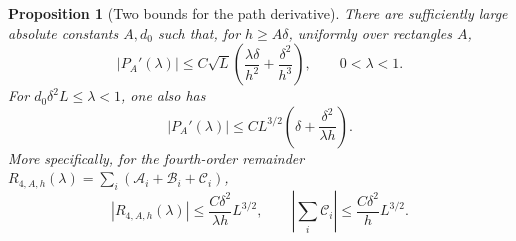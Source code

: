 \documentclass[11pt,letterpaper]{article}
\newtheorem{proposition}{Proposition}
\theoremstyle{remark}
\begin{document}
\begin{proposition}[Two bounds for the path derivative]
\label{appx-an:prop:derivative}
There are sufficiently large absolute constants \(A,d_0\) such that,
for \(h\ge A\delta\), uniformly over rectangles \(A\),
\begin{equation}
 |P_A'(\lambda)|
 \le C\sqrt L\left(\frac{\lambda\delta}{h^2}
                         +\frac{\delta^2}{h^3}\right),
 \qquad 0<\lambda<1.
 \label{appx-an:early}
\end{equation}
For \(d_0\delta^2L\le\lambda<1\), one also has
\begin{equation}
 |P_A'(\lambda)|
 \le CL^{3/2}\left(\delta+\frac{\delta^2}{\lambda h}\right).
 \label{appx-an:late}
\end{equation}
More specifically, for the fourth-order remainder
\(R_{4,A,h}(\lambda)=\sum_i(\mathcal A_i+\mathcal B_i+\mathcal C_i)\),
\begin{equation}
 |R_{4,A,h}(\lambda)|\le\frac{C\delta^2}{\lambda h}L^{3/2},
 \qquad
 \left|\sum_i\mathcal C_i\right|
       \le\frac{C\delta^2}{h}L^{3/2}.
 \label{appx-an:remainder}
\end{equation}
\end{proposition}
\end{document}
